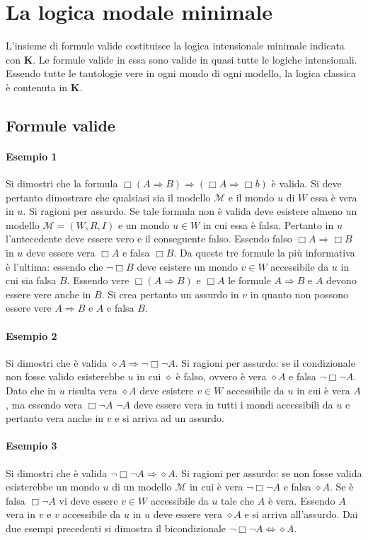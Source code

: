 \chapter{La logica modale minimale}
L'insieme di formule valide costituisce la logica intensionale minimale indicata con $\mathbf{K}$. Le formule valide in essa sono valide in quasi tutte le logiche intensionali. Essendo tutte le tautologie vere
in ogni mondo di ogni modello, la logica classica \`e contenuta in $\mathbf{K}$. 
\section{Formule valide}
\subsubsection{Esempio 1}
Si dimostri che la formula $\Box(A\Rightarrow B)\Rightarrow(\Box A\Rightarrow\Box b)$ \`e valida. Si deve pertanto dimostrare che qualsiasi sia il modello $\mathcal{M}$ e il mondo $u$ di $W$ essa \`e vera 
in $u$. Si ragioni per assurdo. Se tale formula non \`e valida deve esistere almeno un modello $\mathcal{M}=(W,R,I)$ e un mondo $u\in W$ in cui essa \`e falsa. Pertanto in $u$ l'antecedente deve essere vero e
il conseguente falso. Essendo falso $\Box A\Rightarrow \Box B$ in $u$ deve essere vera $\Box A$ e falsa $\Box B$. Da queste tre formule la pi\`u informativa \`e l'ultima: essendo che $\neg\Box B$ deve esistere
un mondo $v\in W$ accessibile da $u$ in cui sia falsa $B$. Essendo vere $\Box (A\Rightarrow B)$ e $\Box A$ le formule $A\Rightarrow B$ e $A$ devono essere vere anche in $B$. Si crea pertanto un assurdo in 
$v$ in quanto non possono essere vere $A\Rightarrow B$ e $A$ e falsa $B$. 
\subsubsection{Esempio 2}
Si dimostri che \`e valida $\diamond A\Rightarrow\neg\Box\neg A$. Si ragioni per assurdo: se il condizionale non fosse valido esisterebbe $u$ in cui $\diamond$ \`e falso, ovvero \`e vera $\diamond A$ e 
falsa $\neg\Box\neg A$. Dato che in $u$ risulta vera $\diamond A$ deve esistere $v\in W$ accessibile da $u$ in cui \`e vera $A$, ma essendo vera $\Box\neg A$ $\neg A$ deve essere vera in tutti i mondi 
accessibili da $u$ e pertanto vera anche in $v$ e si arriva ad un assurdo.
\subsubsection{Esempio 3}
Si dimostri che \`e valida $\neg\Box\neg A\Rightarrow\diamond A$. Si ragioni per assurdo: se non fosse valida esisterebbe un mondo $u$ di un modello $\mathcal{M}$ in cui \`e vera $\neg\Box\neg A$ e
falsa $\diamond A$. Se \`e falsa $\Box\neg A$ vi deve essere $v\in W$ accessibile da $u$ tale che $A$ \`e vera. Essendo $A$ vera in $v$ e $v$ accessibile da $u$ in $u$ deve essere vera $\diamond A$ e si 
arriva all'assurdo. Dai due esempi precedenti si dimostra il bicondizionale $\neg\Box\neg A\Leftrightarrow\diamond A$. 
